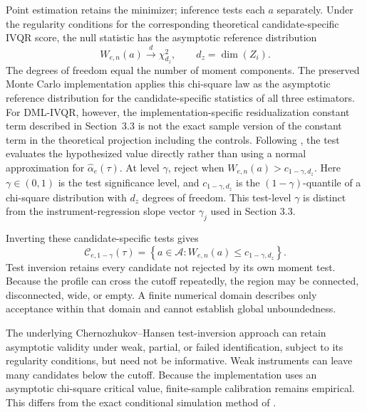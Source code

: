 Point estimation retains the minimizer; inference tests each $a$ separately. Under the regularity conditions for the corresponding theoretical candidate-specific IVQR score, the null statistic has the asymptotic reference distribution
\begin{equation}
    W_{e,n}(a)
    \overset{d}{\longrightarrow}
    \chi^2_{d_z},
    \qquad d_z=\dim(Z_i).
    \label{eq:weak-id-null-distribution}
\end{equation}
The degrees of freedom equal the number of moment components. The preserved Monte Carlo implementation applies this chi-square law as the asymptotic reference distribution for the candidate-specific statistics of all three estimators. For DML-IVQR, however, the implementation-specific residualization constant term described in Section~3.3 is not the exact sample version of the constant term in the theoretical projection including the controls. Following \textcite{chernozhukov_hansen_2008}, the test evaluates the hypothesized value directly rather than using a normal approximation for $\widehat\alpha_e(\tau)$. At level $\gamma$, reject when $W_{e,n}(a)>c_{1-\gamma,d_z}$. Here $\gamma\in(0,1)$ is the test significance level, and $c_{1-\gamma,d_z}$ is the $(1-\gamma)$-quantile of a chi-square distribution with $d_z$ degrees of freedom. This test-level $\gamma$ is distinct from the instrument-regression slope vector $\gamma_j$ used in Section 3.3.

Inverting these candidate-specific tests gives
\begin{equation}
    \mathcal C_{e,1-\gamma}(\tau)
    =
    \left\{
        a\in\mathcal A:
        W_{e,n}(a)\leq c_{1-\gamma,d_z}
    \right\}.
    \label{eq:robust-confidence-region}
\end{equation}
Test inversion retains every candidate not rejected by its own moment test. Because the profile can cross the cutoff repeatedly, the region may be connected, disconnected, wide, or empty. A finite numerical domain describes only acceptance within that domain and cannot establish global unboundedness.

The underlying Chernozhukov--Hansen test-inversion approach can retain asymptotic validity under weak, partial, or failed identification, subject to its regularity conditions, but need not be informative. Weak instruments can leave many candidates below the cutoff. Because the implementation uses an asymptotic chi-square critical value, finite-sample calibration remains empirical. This differs from the exact conditional simulation method of \textcite{chernozhukov_hansen_jansson_2009}.

